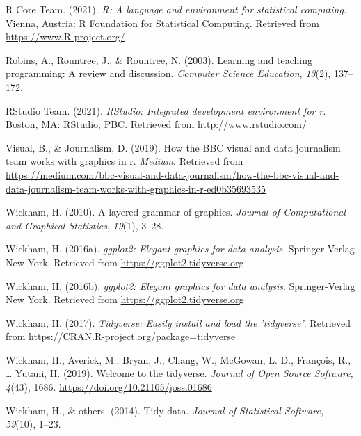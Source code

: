 \documentclass[
  english,
  doc,floatsintext]{apa6}
\newlength{\cslhangindent}
\newenvironment{CSLReferences}[2] %
 {%
  \setlength{\parindent}{0pt}
  \ifodd #1 \everypar{\setlength{\hangindent}{\cslhangindent}}\ignorespaces\fi
  \ifnum #2 > 0
  \setlength{\parskip}{#2\baselineskip}
  \fi
 }%
 {}
\begin{document}
\begin{CSLReferences}{1}{0}
\leavevmode{}%
R Core Team. (2021). \emph{R: A language and environment for statistical computing}. Vienna, Austria: R Foundation for Statistical Computing. Retrieved from \url{https://www.R-project.org/}

\leavevmode{}%
Robins, A., Rountree, J., \& Rountree, N. (2003). Learning and teaching programming: A review and discussion. \emph{Computer Science Education}, \emph{13}(2), 137--172.

\leavevmode{}%
RStudio Team. (2021). \emph{RStudio: Integrated development environment for r}. Boston, MA: RStudio, PBC. Retrieved from \url{http://www.rstudio.com/}

\leavevmode{}%
Visual, B., \& Journalism, D. (2019). How the BBC visual and data journalism team works with graphics in r. \emph{Medium}. Retrieved from \url{https://medium.com/bbc-visual-and-data-journalism/how-the-bbc-visual-and-data-journalism-team-works-with-graphics-in-r-ed0b35693535}

\leavevmode{}%
Wickham, H. (2010). A layered grammar of graphics. \emph{Journal of Computational and Graphical Statistics}, \emph{19}(1), 3--28.

\leavevmode{}%
Wickham, H. (2016a). \emph{ggplot2: Elegant graphics for data analysis}. Springer-Verlag New York. Retrieved from \url{https://ggplot2.tidyverse.org}

\leavevmode{}%
Wickham, H. (2016b). \emph{ggplot2: Elegant graphics for data analysis}. Springer-Verlag New York. Retrieved from \url{https://ggplot2.tidyverse.org}

\leavevmode{}%
Wickham, H. (2017). \emph{Tidyverse: Easily install and load the 'tidyverse'}. Retrieved from \url{https://CRAN.R-project.org/package=tidyverse}

\leavevmode{}%
Wickham, H., Averick, M., Bryan, J., Chang, W., McGowan, L. D., François, R., \ldots{} Yutani, H. (2019). Welcome to the {tidyverse}. \emph{Journal of Open Source Software}, \emph{4}(43), 1686. \url{https://doi.org/10.21105/joss.01686}

\leavevmode{}%
Wickham, H., \& others. (2014). Tidy data. \emph{Journal of Statistical Software}, \emph{59}(10), 1--23.


\end{CSLReferences}
\end{document}
